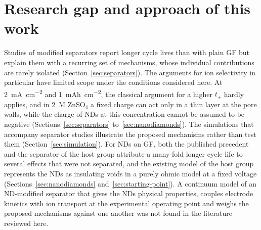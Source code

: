 \section{Research gap and approach of this work}
\label{sec:gap}

Studies of modified separators report longer cycle lives than with plain GF but explain them with a recurring set of mechanisms, whose individual contributions are rarely isolated (Section~\ref{sec:separators}).
The arguments for ion selectivity in particular have limited scope under the conditions considered here.
At \SI{2}{mA.cm^{-2}} and \SI{1}{mAh.cm^{-2}}, the classical argument for a higher $t_+$ hardly applies, and in \SI{2}{M} ZnSO$_4$ a fixed charge can act only in a thin layer at the pore walls, while the charge of NDs at this concentration cannot be assumed to be negative (Sections~\ref{sec:separators} to~\ref{sec:nanodiamonds}).
The simulations that accompany separator studies illustrate the proposed mechanisms rather than test them (Section~\ref{sec:simulation}).
For NDs on GF, both the published precedent and the separator of the host group attribute a many-fold longer cycle life to several effects that were not separated, and the existing model of the host group represents the NDs as insulating voids in a purely ohmic model at a fixed voltage (Sections~\ref{sec:nanodiamonds} and~\ref{sec:starting-point}).
A continuum model of an ND-modified separator that gives the NDs physical properties, couples electrode kinetics with ion transport at the experimental operating point and weighs the proposed mechanisms against one another was not found in the literature reviewed here.

